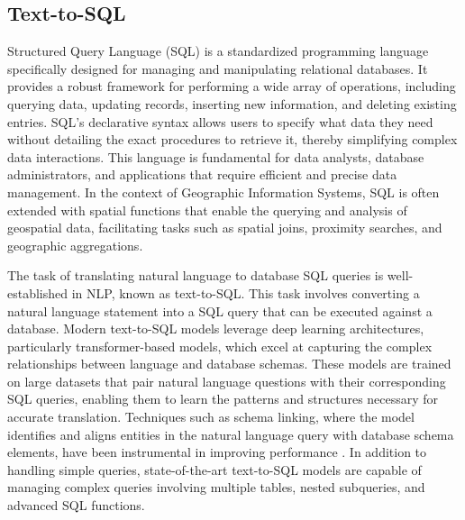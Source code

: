 \subsection{Text-to-SQL}

Structured Query Language (SQL) is a standardized programming language specifically designed for managing and manipulating relational databases. It provides a robust framework for performing a wide array of operations, including querying data, updating records, inserting new information, and deleting existing entries. SQL's declarative syntax allows users to specify what data they need without detailing the exact procedures to retrieve it, thereby simplifying complex data interactions. This language is fundamental for data analysts, database administrators, and applications that require efficient and precise data management. In the context of Geographic Information Systems, SQL is often extended with spatial functions that enable the querying and analysis of geospatial data, facilitating tasks such as spatial joins, proximity searches, and geographic aggregations.


The task of translating natural language to database SQL queries is well-established in NLP, known as text-to-SQL. This task involves converting a natural language statement into a SQL query that can be executed against a database. Modern text-to-SQL models leverage deep learning architectures, particularly transformer-based models, which excel at capturing the complex relationships between language and database schemas. These models are trained on large datasets that pair natural language questions with their corresponding SQL queries, enabling them to learn the patterns and structures necessary for accurate translation. Techniques such as schema linking, where the model identifies and aligns entities in the natural language query with database schema elements, have been instrumental in improving performance \cite{li2024pet}. In addition to handling simple queries, state-of-the-art text-to-SQL models are capable of managing complex queries involving multiple tables, nested subqueries, and advanced SQL functions. 

